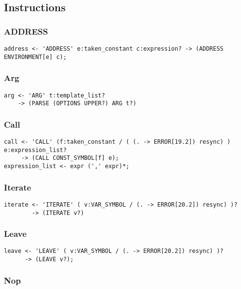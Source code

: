\subsection{Instructions}

\subsubsection{ADDRESS}

\begin{verbatim}
address <- 'ADDRESS' e:taken_constant c:expression? -> (ADDRESS ENVIRONMENT[e] c);
\end{verbatim}

\subsubsection{Arg}

\begin{verbatim}
arg <- 'ARG' t:template_list?
    -> (PARSE (OPTIONS UPPER?) ARG t?)
\end{verbatim}

\subsubsection{Call}

\begin{verbatim}
call <- 'CALL' (f:taken_constant / ( (. -> ERROR[19.2]) resync) ) e:expression_list?
     -> (CALL CONST_SYMBOL[f] e);
expression_list <- expr (',' expr)*;
\end{verbatim}

\subsubsection{Iterate}

\begin{verbatim}
iterate <- 'ITERATE' ( v:VAR_SYMBOL / (. -> ERROR[20.2]) resync) )?
        -> (ITERATE v?)
\end{verbatim}

\subsubsection{Leave}

\begin{verbatim}
leave <- 'LEAVE' ( v:VAR_SYMBOL / (. -> ERROR[20.2]) resync) )?
      -> (LEAVE v?);
\end{verbatim}

\subsubsection{Nop}

